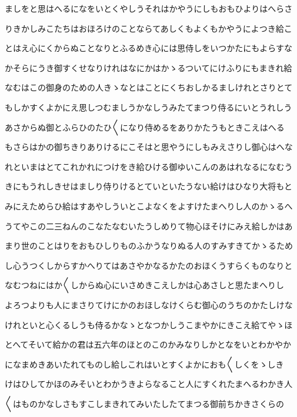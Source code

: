 \documentclass[a4paper,11pt,landscape]{ltjtarticle}
\begin{document}
\par\medskip
ましをと思はへるになをいとくやしうそれはかやうにしもおもひよりはへらさ
\par\medskip
りきかしみこたちはおほろけのことならてあしくもよくもかやうによつき給こ
\par\medskip
とはえ心にくからぬことなりとふるめき心には思侍しをいつかたにもよらすな
\par\medskip
かそらにうき御すくせなりけれはなにかはかゝるついてにけふりにもまきれ給
\par\medskip
なむはこの御身のための人きゝなとはことにくちおしかるましけれとさりとて
\par\medskip
もしかすくよかにえ思しつむましうかなしうみたてまつり侍るにいとうれしう
\par\medskip
あさからぬ御とふらひのたひ〱になり侍めるをありかたうもときこえはへる
\par\medskip
もさらはかの御ちきりありけるにこそはと思やうにしもみえさりし御心はへな
\par\medskip
れといまはとてこれかれにつけをき給ひける御ゆいこんのあはれなるになむう
\par\medskip
きにもうれしきせはましり侍りけるとていといたうない給けはひなり大将もと
\par\medskip
みにえためらひ給はすあやしういとこよなくをよすけたまへりし人のかゝるへ
\par\medskip
うてやこの二三ねんのこなたなむいたうしめりて物心ほそけにみえ給しかはあ
\par\medskip
まり世のことはりをおもひしりものふかうなりぬる人のすみすきてかゝるため
\par\medskip
し心うつくしからすかへりてはあさやかなるかたのおほくうすらくものなりと
\par\medskip
なむつねにはか〱しからぬ心にいさめきこえしかは心あさしと思たまへりし
\par\medskip
よろつよりも人にまさりてけにかのおほしなけくらむ御心のうちのかたしけな
\par\medskip
けれといと心くるしうも侍るかなゝとなつかしうこまやかにきこえ給てやゝほ
\par\medskip
とへてそいて給かの君は五六年のほとのこのかみなりしかとなをいとわかやか
\par\medskip
になまめきあいたれてものし給しこれはいとすくよかにおも〱しくをゝしき
\par\medskip
けはひしてかほのみそいとわかうきよらなること人にすくれたまへるわかき人
\par\medskip
〱はものかなしさもすこしまきれてみいたしたてまつる御前ちかきさくらの
\par\medskip
\end{document}
